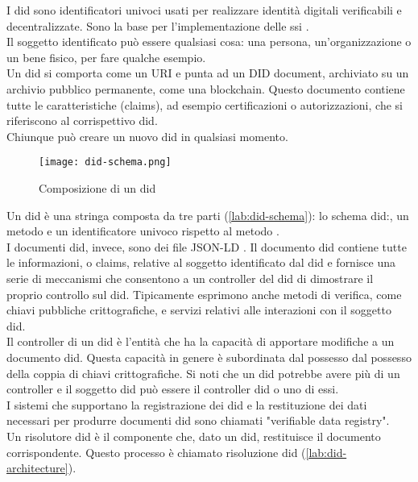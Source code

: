 I \gls{did} sono identificatori univoci usati per realizzare identità digitali verificabili e decentralizzate. Sono la base per l'implementazione delle \gls{ssi} \cite{art:ssi}. \\
Il soggetto identificato può essere qualsiasi cosa: una persona, un'organizzazione o un bene fisico, per fare qualche esempio. \\
Un \gls{did} si comporta come un URI e punta ad un DID document, archiviato su un archivio pubblico permanente, come una blockchain.
Questo documento contiene tutte le caratteristiche (claims), ad esempio certificazioni o autorizzazioni, che si riferiscono al corrispettivo \gls{did}. \\
Chiunque può creare un nuovo \gls{did} in qualsiasi momento.

\begin{figure}[ht]
    \texttt{[image: did-schema.png]}
    \centering
    \caption{Composizione di un \gls{did} \cite{img:did-schema}}
    \label{lab:did-schema}
\end{figure}

Un \gls{did} è una stringa composta da tre parti (\autoref{lab:did-schema}): lo schema did:, un metodo e un identificatore univoco rispetto al metodo \cite{wiki:did}. \\
I documenti \gls{did}, invece, sono dei file JSON-LD \cite{wiki:json-ld}. Il documento \gls{did} contiene tutte le informazioni, o claims,
relative al soggetto identificato dal \gls{did} e fornisce una serie di meccanismi che consentono a un controller del \gls{did} di dimostrare il proprio controllo sul \gls{did}.
Tipicamente esprimono anche metodi di verifica, come chiavi pubbliche crittografiche, e servizi relativi alle interazioni con il soggetto \gls{did}. \\
Il controller di un \gls{did} è l'entità che ha la capacità di apportare modifiche a un documento \gls{did}. Questa capacità in genere è subordinata dal possesso dal possesso della coppia di chiavi crittografiche.
Si noti che un \gls{did} potrebbe avere più di un controller e il soggetto \gls{did} può essere il controller \gls{did} o uno di essi. \\
I sistemi che supportano la registrazione dei \gls{did} e la restituzione dei dati necessari per produrre documenti \gls{did} sono chiamati "verifiable data registry". \\
Un risolutore \gls{did} è il componente che, dato un \gls{did}, restituisce il documento corrispondente. Questo processo è chiamato risoluzione \gls{did} (\autoref{lab:did-architecture}).

